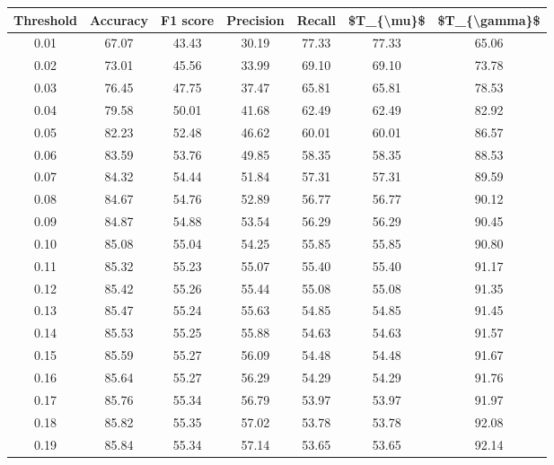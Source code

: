 \begin{tabular}{|c|c|c|c|c|c|c|}
\toprule
 Threshold &  Accuracy &  F1 score &  Precision &  Recall &  \$T\_\{\textbackslash mu\}\$ &  \$T\_\{\textbackslash gamma\}\$ \\
\hline
      0.01 &     67.07 &     43.43 &      30.19 &   77.33 &      77.33 &         65.06 \\
      0.02 &     73.01 &     45.56 &      33.99 &   69.10 &      69.10 &         73.78 \\
      0.03 &     76.45 &     47.75 &      37.47 &   65.81 &      65.81 &         78.53 \\
      0.04 &     79.58 &     50.01 &      41.68 &   62.49 &      62.49 &         82.92 \\
      0.05 &     82.23 &     52.48 &      46.62 &   60.01 &      60.01 &         86.57 \\
      0.06 &     83.59 &     53.76 &      49.85 &   58.35 &      58.35 &         88.53 \\
      0.07 &     84.32 &     54.44 &      51.84 &   57.31 &      57.31 &         89.59 \\
      0.08 &     84.67 &     54.76 &      52.89 &   56.77 &      56.77 &         90.12 \\
      0.09 &     84.87 &     54.88 &      53.54 &   56.29 &      56.29 &         90.45 \\
      0.10 &     85.08 &     55.04 &      54.25 &   55.85 &      55.85 &         90.80 \\
      0.11 &     85.32 &     55.23 &      55.07 &   55.40 &      55.40 &         91.17 \\
      0.12 &     85.42 &     55.26 &      55.44 &   55.08 &      55.08 &         91.35 \\
      0.13 &     85.47 &     55.24 &      55.63 &   54.85 &      54.85 &         91.45 \\
      0.14 &     85.53 &     55.25 &      55.88 &   54.63 &      54.63 &         91.57 \\
      0.15 &     85.59 &     55.27 &      56.09 &   54.48 &      54.48 &         91.67 \\
      0.16 &     85.64 &     55.27 &      56.29 &   54.29 &      54.29 &         91.76 \\
      0.17 &     85.76 &     55.34 &      56.79 &   53.97 &      53.97 &         91.97 \\
      0.18 &     85.82 &     55.35 &      57.02 &   53.78 &      53.78 &         92.08 \\
      0.19 &     85.84 &     55.34 &      57.14 &   53.65 &      53.65 &         92.14 \\

\end{tabular}
